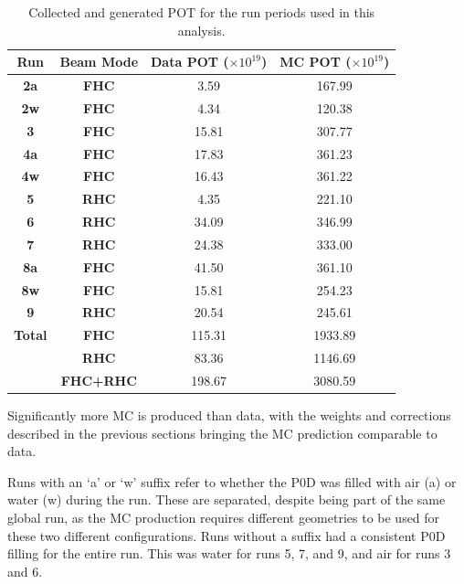 \begin{center}
\begin{table}
\center
\large
\begin{tabular}{ c|c||c|c}
\hline
\hline
\textbf{Run} & \textbf{Beam Mode} & \textbf{Data POT ($\times10^{19}$)} & \textbf{MC POT ($\times10^{19}$)} \\
\hline
\hline
\textbf{2a} & \textbf{FHC} & 3.59 & 167.99 \\
\textbf{2w} & \textbf{FHC} & 4.34 & 120.38 \\
\hline
\textbf{3} & \textbf{FHC} & 15.81 & 307.77 \\
\hline
\textbf{4a} & \textbf{FHC} & 17.83 & 361.23 \\
\textbf{4w} & \textbf{FHC} & 16.43 & 361.22 \\
\hline
\textbf{5} & \textbf{RHC} & 4.35 & 221.10 \\
\hline
\textbf{6} & \textbf{RHC} & 34.09 & 346.99 \\
\hline
\textbf{7} & \textbf{RHC} & 24.38 & 333.00 \\
\hline
\textbf{8a} & \textbf{FHC} & 41.50 & 361.10 \\
\textbf{8w} & \textbf{FHC} & 15.81 & 254.23 \\
\hline
\textbf{9} & \textbf{RHC} & 20.54 & 245.61 \\
\hline \hline
\textbf{Total} & \textbf{FHC}  & 115.31 & 1933.89 \\ 
& \textbf{RHC} & 83.36 & 1146.69 \\
& \textbf{FHC+RHC}  & 198.67  & 3080.59 \\
\hline
\hline

\end{tabular}
\caption{Collected and generated POT for the run periods used in this analysis.}
\label{tab:pot}
\end{table}
\end{center}
\vspace{-0.8cm}

Significantly more MC is produced than data, with the weights and corrections described in the previous sections bringing the MC prediction comparable to data. 

Runs with an `a' or `w' suffix refer to whether the P0D was filled with air (a) or water (w) during the run. These are separated, despite being part of the same global run, as the MC production requires different geometries to be used for these two different configurations. Runs without a suffix had a consistent P0D filling for the entire run. This was water for runs 5, 7, and 9, and air for runs 3 and 6.

